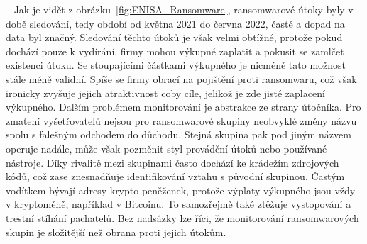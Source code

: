 ~
Jak je vidět z obrázku~\ref{fig:ENISA_Ransomware}, ransomwarové útoky byly v době sledování, tedy období od května 2021 do června 2022, časté a dopad na data byl značný.
Sledování těchto útoků je však velmi obtížné, protože pokud dochází pouze k vydírání, firmy mohou výkupné zaplatit a pokusit se zamlčet existenci útoku.
Se stoupajícími částkami výkupného je nicméně tato možnost stále méně validní.
Spíše se firmy obrací na pojištění proti ransomwaru, což však ironicky zvyšuje jejich atraktivnost coby cíle, jelikož je zde jisté zaplacení výkupného.
Dalším problémem monitorování je abstrakce ze strany útočníka.
Pro zmatení vyšetřovatelů nejsou pro ransomwarové skupiny neobvyklé změny názvu spolu s falešným odchodem do důchodu.
Stejná skupina pak pod jiným názvem operuje nadále, může však pozměnit styl provádění útoků nebo používané nástroje.
Díky rivalitě mezi skupinami často dochází ke krádežím zdrojových kódů, což zase znesnadňuje identifikování vztahu s původní skupinou.
Častým vodítkem bývají adresy krypto peněženek, protože výplaty výkupného jsou vždy v kryptoměně, například v Bitcoinu.
To samozřejmě také ztěžuje vystopování a trestní stíhání pachatelů.
Bez nadsázky lze říci, že monitorování ransomwarových skupin je složitější než obrana proti jejich útokům.\cite{Enisa_thread_landscape}

